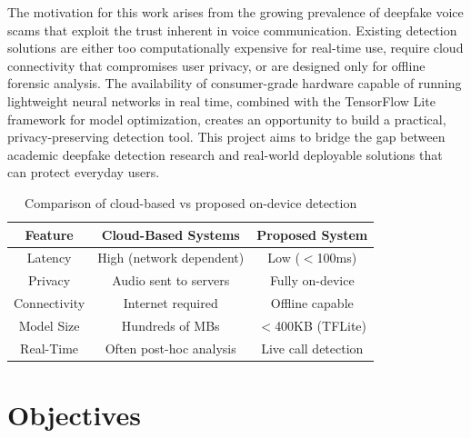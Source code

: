 \documentclass[12pt,a4paper,titlepage]{report}
\begin{document}
	The motivation for this work arises from the growing prevalence of deepfake voice scams that exploit the trust inherent in voice communication. Existing detection solutions are either too computationally expensive for real-time use, require cloud connectivity that compromises user privacy, or are designed only for offline forensic analysis. The availability of consumer-grade hardware capable of running lightweight neural networks in real time, combined with the TensorFlow Lite framework for model optimization, creates an opportunity to build a practical, privacy-preserving detection tool. This project aims to bridge the gap between academic deepfake detection research and real-world deployable solutions that can protect everyday users.
	
	
	\begin{table}[!h]
		\begin{center}
			\begin{tabular}{|c|c|c|}
				\hline
				\textbf{Feature} & \textbf{Cloud-Based Systems} & \textbf{Proposed System} \\
				\hline
				Latency & High (network dependent) & Low ($<$100ms) \\
				\hline
				Privacy & Audio sent to servers & Fully on-device \\
				\hline
				Connectivity & Internet required & Offline capable \\
				\hline
				Model Size & Hundreds of MBs & $<$400KB (TFLite) \\
				\hline
				Real-Time & Often post-hoc analysis & Live call detection \\
				\hline
			\end{tabular}
			\caption{Comparison of cloud-based vs proposed on-device detection}
		\end{center}
	\end{table}
	
	\section{Objectives}
	
\end{document}
